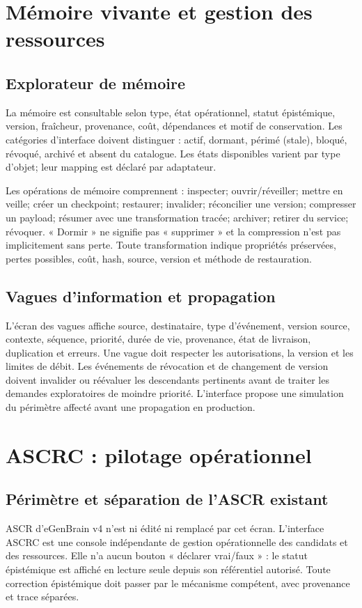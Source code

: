\documentclass[11pt,a4paper]{article}
\begin{document}
\section{Mémoire vivante et gestion des ressources}
\subsection{Explorateur de mémoire}
La mémoire est consultable selon type, état opérationnel, statut épistémique, version, fraîcheur, provenance, coût, dépendances et motif de conservation. Les catégories d'interface doivent distinguer : actif, dormant, périmé (stale), bloqué, révoqué, archivé et absent du catalogue. Les états disponibles varient par type d'objet; leur mapping est déclaré par adaptateur.

Les opérations de mémoire comprennent : inspecter; ouvrir/réveiller; mettre en veille; créer un checkpoint; restaurer; invalider; réconcilier une version; compresser un payload; résumer avec une transformation tracée; archiver; retirer du service; révoquer. « Dormir » ne signifie pas « supprimer » et la compression n'est pas implicitement sans perte. Toute transformation indique propriétés préservées, pertes possibles, coût, hash, source, version et méthode de restauration.

\subsection{Vagues d'information et propagation}
L'écran des vagues affiche source, destinataire, type d'événement, version source, contexte, séquence, priorité, durée de vie, provenance, état de livraison, duplication et erreurs. Une vague doit respecter les autorisations, la version et les limites de débit. Les événements de révocation et de changement de version doivent invalider ou réévaluer les descendants pertinents avant de traiter les demandes exploratoires de moindre priorité. L'interface propose une simulation du périmètre affecté avant une propagation en production.

\section{ASCRC : pilotage opérationnel}
\subsection{Périmètre et séparation de l'ASCR existant}
ASCR d'eGenBrain v4 n'est ni édité ni remplacé par cet écran. L'interface ASCRC est une console indépendante de gestion opérationnelle des candidats et des ressources. Elle n'a aucun bouton « déclarer vrai/faux » : le statut épistémique est affiché en lecture seule depuis son référentiel autorisé. Toute correction épistémique doit passer par le mécanisme compétent, avec provenance et trace séparées.
\end{document}
